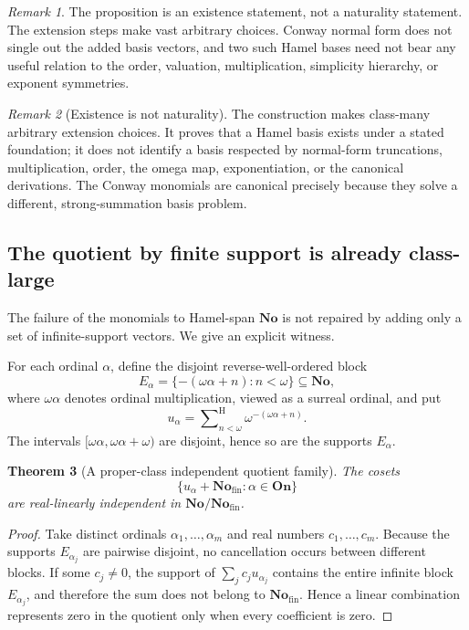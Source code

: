 \documentclass[11pt,letterpaper]{article}
\numberwithin{equation}{section}
\newtheorem{theorem}{Theorem}[section]
\theoremstyle{definition}
\theoremstyle{remark}
\newtheorem{remark}[theorem]{Remark}
\newcommand{\No}{\mathbf{No}}
\newcommand{\On}{\mathbf{On}}
\newcommand{\Fin}{\No_{\mathrm{fin}}}
\newcommand{\sH}{\mathop{\sum}\nolimits^{\mathrm H}}
\begin{document}
\begin{remark}
The proposition is an existence statement, not a naturality statement. The extension
steps make vast arbitrary choices. Conway normal form does not single out the added
basis vectors, and two such Hamel bases need not bear any useful relation to the
order, valuation, multiplication, simplicity hierarchy, or exponent symmetries.
\end{remark}
\begin{remark}[Existence is not naturality]
The construction makes class-many arbitrary extension choices.  It proves
that a Hamel basis exists under a stated foundation; it does not identify a
basis respected by normal-form truncations, multiplication, order, the omega
map, exponentiation, or the canonical derivations.  The Conway monomials are
canonical precisely because they solve a different, strong-summation basis
problem.
\end{remark}

\subsection{The quotient by finite support is already class-large}

The failure of the monomials to Hamel-span \(\No\) is not repaired by adding
only a set of infinite-support vectors.  We give an explicit witness.

For each ordinal \(\alpha\), define the disjoint reverse-well-ordered block
\begin{equation}\label{rvs:eq:block-Ea}
 E_\alpha=
 \{-\!(\omega\alpha+n):n<\omega\}\subseteq\No,
\end{equation}
where \(\omega\alpha\) denotes ordinal multiplication, viewed as a surreal
ordinal, and put
\begin{equation}\label{rvs:eq:block-ua}
 u_\alpha=\sH_{n<\omega}
          \omega^{-(\omega\alpha+n)}.
\end{equation}
The intervals \([\omega\alpha,\omega\alpha+\omega)\) are disjoint, hence so
are the supports \(E_\alpha\).

\begin{theorem}[A proper-class independent quotient family]
\label{rvs:thm:quotient-independent}
The cosets
\[
  \{u_\alpha+\Fin:\alpha\in\On\}
\]
are real-linearly independent in \(\No/\Fin\).
\end{theorem}

\begin{proof}
Take distinct ordinals \(\alpha_1,\ldots,\alpha_m\) and real numbers
\(c_1,\ldots,c_m\).  Because the supports \(E_{\alpha_j}\) are pairwise
disjoint, no cancellation occurs between different blocks.  If some
\(c_j\ne0\), the support of \(\sum_j c_j u_{\alpha_j}\) contains the entire
infinite block \(E_{\alpha_j}\), and therefore the sum does not belong to
\(\Fin\).  Hence a linear combination represents zero in the quotient only
when every coefficient is zero.
\end{proof}
\end{document}
